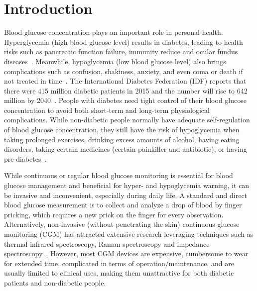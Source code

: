 
\section{Introduction}
\label{sec:intro}
Blood glucose concentration plays an important role in personal health.
Hyperglycemia (high blood glucose level) results in diabetes, leading to health risks such as pancreatic function failure, immunity reduce and ocular fundus diseases~\cite{bib:DC95:Klein}.
Meanwhile, hypoglycemia (low blood glucose level) also brings complications such as confusion, shakiness, anxiety, and even coma or death if not treated in time~\cite{bib:AJM91:DCCT}.
The International Diabetes Federation (IDF) reports that there were 415 million diabetic patients in 2015 and the number will rise to 642 million by 2040~\cite{bib:IDF15}.
People with diabetes need tight control of their blood glucose concentration to avoid both short-term and long-term physiological complications.
While non-diabetic people normally have adequate self-regulation of blood glucose concentration, they still have the risk of hypoglycemia when taking prolonged exercises, drinking excess amounts of alcohol, having eating disorders, taking certain medicines (\eg certain painkiller and antibiotic), or having pre-diabetes~\cite{bib:JCEM13:Eckert, bib:NEJM82:Felig}.

While continuous or regular blood glucose monitoring is essential for blood glucose management and beneficial for hyper- and hypoglycemia warning, it can be invasive and inconvenient, especially during daily life.
A standard and direct blood glucose measurement is to collect and analyze a drop of blood by finger pricking, which requires a new prick on the finger for every  observation.
Alternatively, non-invasive (without penetrating the skin) continuous glucose monitoring (CGM) has attracted extensive research leveraging techniques such as thermal infrared spectroscopy, Raman spectroscopy and impedance spectroscopy~\cite{bib:MEP08:Do, bib:JDST10:Vaddiraju}.
However, most CGM devices are expensive, cumbersome to wear for extended time, complicated in terms of operation/maintenance, and are usually limited to clinical uses, making them unattractive for both diabetic patients and non-diabetic people.


